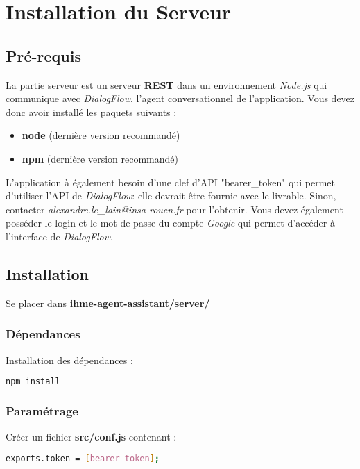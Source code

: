 \chapter{Installation du Serveur}

\section{Pré-requis}
La partie serveur est un serveur \textbf{REST} dans un environnement \emph{Node.js} qui communique avec \emph{DialogFlow}, l'agent conversationnel de l'application. Vous devez donc avoir installé les paquets suivants :
\begin{itemize}
\item \textbf{node} (dernière version recommandé)
\item \textbf{npm} (dernière version recommandé)\\
\end{itemize}


L'application à également besoin d'une clef d'API "bearer\_token" qui permet d'utiliser l'API de \emph{DialogFlow}: elle devrait être fournie avec le livrable. Sinon, contacter \emph{alexandre.le\_lain@insa-rouen.fr} pour l'obtenir.
Vous devez également posséder le login et le mot de passe du compte \emph{Google} qui permet d'accéder à l'interface de \emph{DialogFlow}.

\section{Installation}

Se placer dans \textbf{ihme-agent-assistant/server/}

\subsection{Dépendances}

Installation des dépendances :
  \begin{lstlisting}[language=bash]
      npm install
  \end{lstlisting}

\subsection{Paramétrage}

Créer un fichier \textbf{src/conf.js} contenant :
\begin{lstlisting}[language=bash]
  exports.token = [bearer_token];
\end{lstlisting}

